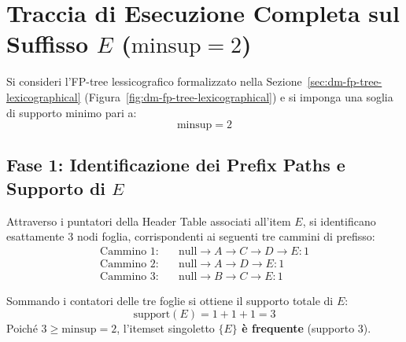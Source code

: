 \section{Traccia di Esecuzione Completa sul Suffisso \texorpdfstring{$E$}{E} (\texorpdfstring{$\text{minsup} = 2$}{minsup = 2})}
\label{sec:dm-fp-execution-trace-e}

Si consideri l'FP-tree lessicografico formalizzato nella Sezione~\ref{sec:dm-fp-tree-lexicographical} (Figura~\ref{fig:dm-fp-tree-lexicographical}) e si imponga una soglia di supporto minimo pari a:
\begin{equation}
\text{minsup} = 2
\end{equation}

\FloatBarrier
\subsection{Fase 1: Identificazione dei Prefix Paths e Supporto di $E$}
Attraverso i puntatori della Header Table associati all'item $E$, si identificano esattamente 3 nodi foglia, corrispondenti ai seguenti tre cammini di prefisso:
\begin{align}
\text{Cammino 1:} \quad &\text{null} \to A \to C \to D \to E:1 \\
\text{Cammino 2:} \quad &\text{null} \to A \to D \to E:1 \\
\text{Cammino 3:} \quad &\text{null} \to B \to C \to E:1
\end{align}

Sommando i contatori delle tre foglie si ottiene il supporto totale di $E$:
\begin{equation}
\text{support}(E) = 1 + 1 + 1 = 3
\end{equation}
Poiché $3 \ge \text{minsup} = 2$, l'itemset singoletto \textbf{$\{E\}$ è frequente} (supporto 3).

\FloatBarrier
